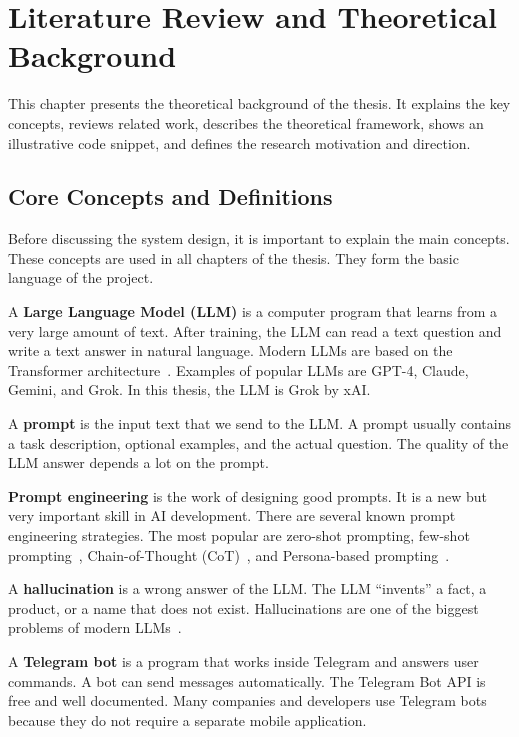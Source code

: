 \chapter{Literature Review and Theoretical Background}
\label{ch:literature}

This chapter presents the theoretical background of the thesis. It explains the key concepts, reviews related work, describes the theoretical framework, shows an illustrative code snippet, and defines the research motivation and direction.

\section{Core Concepts and Definitions}
\label{sec:concepts}

Before discussing the system design, it is important to explain the main concepts. These concepts are used in all chapters of the thesis. They form the basic language of the project.

A \textbf{Large Language Model (LLM)} is a computer program that learns from a very large amount of text. After training, the LLM can read a text question and write a text answer in natural language. Modern LLMs are based on the Transformer architecture~\cite{vaswani2017attention}. Examples of popular LLMs are GPT-4, Claude, Gemini, and Grok. In this thesis, the LLM is Grok by xAI.

A \textbf{prompt} is the input text that we send to the LLM. A prompt usually contains a task description, optional examples, and the actual question. The quality of the LLM answer depends a lot on the prompt.

\textbf{Prompt engineering} is the work of designing good prompts. It is a new but very important skill in AI development. There are several known prompt engineering strategies. The most popular are zero-shot prompting, few-shot prompting~\cite{brown2020language}, Chain-of-Thought (CoT)~\cite{wei2022chain}, and Persona-based prompting~\cite{shanahan2023role}.

A \textbf{hallucination} is a wrong answer of the LLM. The LLM ``invents'' a fact, a product, or a name that does not exist. Hallucinations are one of the biggest problems of modern LLMs~\cite{huang2023survey}.

A \textbf{Telegram bot} is a program that works inside Telegram and answers user commands. A bot can send messages automatically. The Telegram Bot API is free and well documented. Many companies and developers use Telegram bots because they do not require a separate mobile application.

